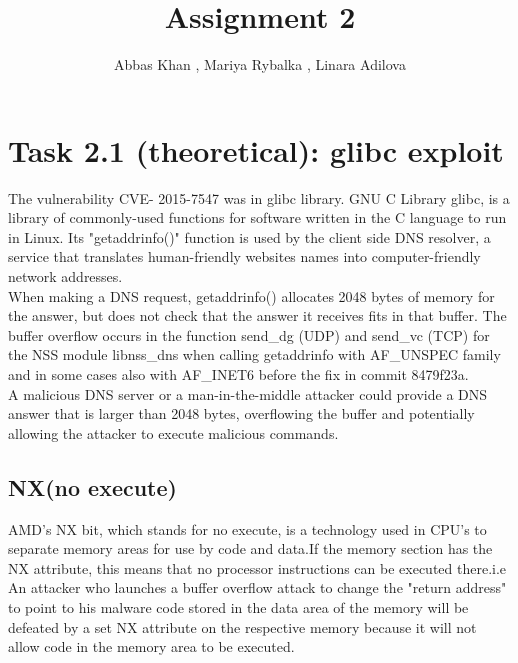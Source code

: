 \documentclass{article}
\title{Assignment 2}
\author{Abbas Khan , Mariya Rybalka , Linara Adilova}
\begin{document}
\maketitle 
    
\newpage
    
\section*{Task 2.1 (theoretical): glibc exploit}
    The vulnerability CVE- 2015-7547 was in glibc library. GNU C Library glibc, is a library of commonly-used functions for software written in the C language to run in Linux. Its "getaddrinfo()" function is used by the client side DNS resolver, a service that translates human-friendly websites names into computer-friendly network addresses.
\\
When making a DNS request, getaddrinfo() allocates 2048 bytes of memory for the answer, but does not check that the answer it receives fits in that buffer. The buffer overflow occurs in the function send{\_}dg (UDP) and send{\_}vc (TCP) for the NSS module libnss{\_}dns when calling getaddrinfo with AF{\_}UNSPEC family and in some cases also with AF{\_}INET6 before the fix in
commit 8479f23a.
\\
A malicious DNS server or a man-in-the-middle attacker could provide a DNS answer that is larger than 2048 bytes, overflowing the buffer and potentially allowing the attacker to execute malicious commands.
	  
\subsection*{NX(no execute)}
AMD's NX bit, which stands for no execute, is a technology used in CPU's to separate memory areas
for use by code and data.If the memory section has the NX attribute, this means that no processor instructions can be executed there.i.e An attacker who launches a buffer overflow attack to change
the "return address" to point to his malware code stored in the data area of the memory will be 
defeated by a set NX attribute on the respective memory because it will not allow code in the
memory area to be executed. 
	 
\end{document}
